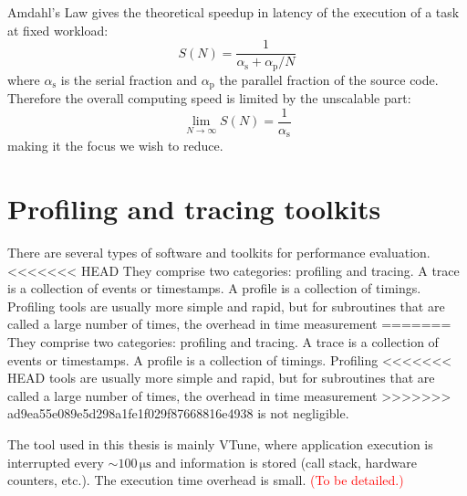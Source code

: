 Amdahl's Law gives the theoretical speedup in latency of the execution
of a task at fixed workload:
\begin{equation}
S(N)=\dfrac{1}{\alpha_{\mathrm{s}}+\alpha_{\mathrm{p}}/N}
\end{equation}
where $\alpha_{\mathrm{s}}$ is the serial fraction and $\alpha_{\mathrm{p}}$
the parallel fraction of the source code. Therefore the overall computing
speed is limited by the unscalable part:
\begin{equation}
\lim_{N\rightarrow\infty}S(N)=\frac{1}{\alpha_{\mathrm{s}}}
\end{equation}
making it the focus we wish to reduce.


\section{Profiling and tracing toolkits}

There are several types of software and toolkits for performance evaluation.
<<<<<<< HEAD
They comprise two categories: profiling and tracing. A trace is a
collection of events or timestamps. A profile is a collection of timings.
Profiling tools are usually more simple and rapid, but for subroutines
that are called a large number of times, the overhead in time measurement
=======
They comprise two categories: profiling and tracing. A trace is a collection
of events or timestamps. A profile is a collection of timings. Profiling
<<<<<<< HEAD
tools are usually more simple and rapid, but for subroutines that
are called a large number of times, the overhead in time measurement
>>>>>>> ad9ea55e089e5d298a1fe1f029f87668816e4938
is not negligible. 

The tool used in this thesis is mainly VTune, where application execution
is interrupted every $\sim100\,\mathrm{\mu s}$ and information is
stored (call stack, hardware counters, etc.). The execution time overhead
is small. \textcolor{red}{(To be detailed.)}
